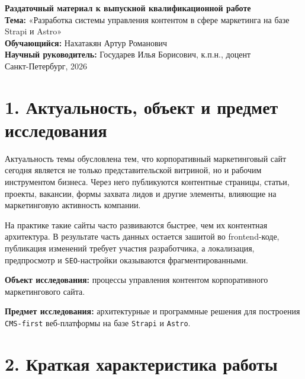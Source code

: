 \documentclass[12pt,a4paper]{article}
\begin{document}
\begin{center}
{\Large \textbf{Раздаточный материал к выпускной квалификационной работе}}\\[0.8em]
{\normalsize \textbf{Тема:} «Разработка системы управления контентом в сфере маркетинга на базе Strapi и Astro»}\\[0.4em]
{\normalsize \textbf{Обучающийся:} Нахатакян Артур Романович}\\
{\normalsize \textbf{Научный руководитель:} Государев Илья Борисович, к.п.н., доцент}\\
{\normalsize Санкт-Петербург, 2026}
\end{center}

\section*{1. Актуальность, объект и предмет исследования}

Актуальность темы обусловлена тем, что корпоративный маркетинговый сайт сегодня является не
только представительской витриной, но и рабочим инструментом бизнеса. Через него
публикуются контентные страницы, статьи, проекты, вакансии, формы захвата лидов и другие
элементы, влияющие на маркетинговую активность компании.

На практике такие сайты часто развиваются быстрее, чем их контентная архитектура. В
результате часть данных остается зашитой во frontend-коде, публикация изменений требует
участия разработчика, а локализация, предпросмотр и \texttt{SEO}-настройки оказываются
фрагментированными.

\textbf{Объект исследования:} процессы управления контентом корпоративного маркетингового
сайта.

\textbf{Предмет исследования:} архитектурные и программные решения для построения
\texttt{CMS-first} веб-платформы на базе \texttt{Strapi} и \texttt{Astro}.

\section*{2. Краткая характеристика работы}
\end{document}
